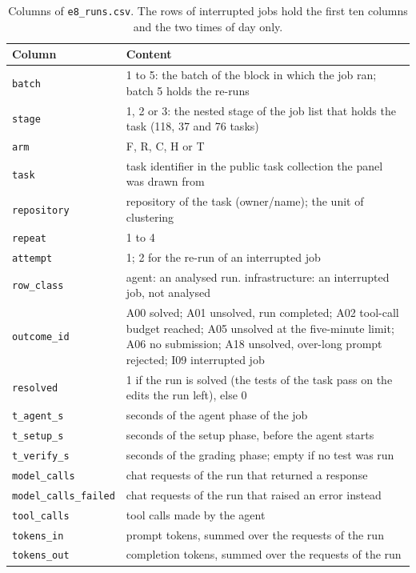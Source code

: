 \begin{table}[!htb]
\centering
\caption{Columns of \texttt{e8\_runs.csv}. The rows of interrupted jobs hold the first ten columns and the two times of day only.}\label{tab:s-columns}
\footnotesize
\begin{tabular}{lp{11.4cm}}
\toprule
Column & Content \\
\midrule
\texttt{batch} & 1 to 5: the batch of the block in which the job ran; batch 5 holds the re-runs \\
\texttt{stage} & 1, 2 or 3: the nested stage of the job list that holds the task (118, 37 and 76 tasks) \\
\texttt{arm} & F, R, C, H or T \\
\texttt{task} & task identifier in the public task collection the panel was drawn from \\
\texttt{repository} & repository of the task (owner/name); the unit of clustering \\
\texttt{repeat} & 1 to 4 \\
\texttt{attempt} & 1; 2 for the re-run of an interrupted job \\
\texttt{row\_class} & agent: an analysed run. infrastructure: an interrupted job, not analysed \\
\texttt{outcome\_id} & A00 solved; A01 unsolved, run completed; A02 tool-call budget reached; A05 unsolved at the five-minute limit; A06 no submission; A18 unsolved, over-long prompt rejected; I09 interrupted job \\
\texttt{resolved} & 1 if the run is solved (the tests of the task pass on the edits the run left), else 0 \\
\texttt{t\_agent\_s} & seconds of the agent phase of the job \\
\texttt{t\_setup\_s} & seconds of the setup phase, before the agent starts \\
\texttt{t\_verify\_s} & seconds of the grading phase; empty if no test was run \\
\texttt{model\_calls} & chat requests of the run that returned a response \\
\texttt{model\_calls\_failed} & chat requests of the run that raised an error instead \\
\texttt{tool\_calls} & tool calls made by the agent \\
\texttt{tokens\_in} & prompt tokens, summed over the requests of the run \\
\texttt{tokens\_out} & completion tokens, summed over the requests of the run \\

\end{tabular}
\end{table}
